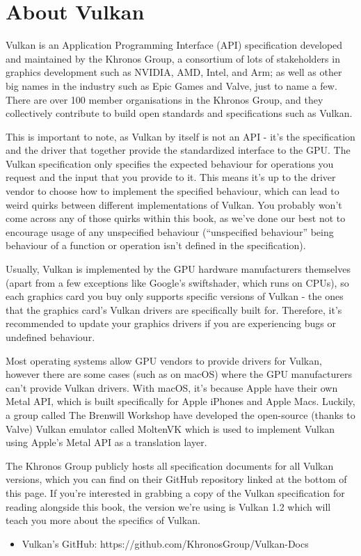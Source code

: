 \newpage
\section{\textsf{About Vulkan}}\label{about-vulkan}

Vulkan is an Application Programming Interface (API) specification
developed and maintained by the Khronos Group, a consortium of lots of stakeholders in graphics development such as NVIDIA, AMD, Intel, and Arm; as well as other big names in the industry such as Epic Games and Valve, just to name a few. There are over 100 member organisations in the Khronos Group, and they collectively contribute to build open standards and specifications such as Vulkan.

This is important to note, as Vulkan by itself is not an API - it's the specification and the driver that together provide the standardized interface to the GPU. The Vulkan specification only specifies the expected behaviour for operations you request and the input that you provide to it. This means it's up to the driver vendor to choose how to implement the specified behaviour, which can lead to weird quirks between different implementations of Vulkan. You probably won't come across any of those quirks within this book, as we've done our best not to encourage usage of any unspecified behaviour (``unspecified behaviour'' being behaviour of a function or operation isn't defined in the specification).

Usually, Vulkan is implemented by the GPU hardware manufacturers
themselves (apart from a few exceptions like Google's swiftshader, which runs on CPUs), so each graphics card you buy only supports specific versions of Vulkan - the ones that the graphics card's Vulkan drivers are specifically built for. Therefore, it's recommended to update your graphics drivers if you are experiencing bugs or undefined behaviour.

Most operating systems allow GPU vendors to provide drivers for Vulkan, however there are some cases (such as on macOS) where the GPU manufacturers can't provide Vulkan drivers. With macOS, it's because Apple have their own Metal API, which is built specifically for Apple iPhones and Apple Macs. Luckily, a group called The Brenwill Workshop have developed the open-source (thanks to Valve) Vulkan emulator called MoltenVK which is used to implement Vulkan using Apple's Metal API as a translation layer.

The Khronos Group publicly hosts all specification documents for all Vulkan versions, which you can find on their GitHub repository linked at the bottom of this page. If you're interested in grabbing a copy of the Vulkan specification for reading alongside this book, the version we're using is Vulkan 1.2 which will teach you more about the specifics of Vulkan.

\begin{itemize}
\itemsep1pt\parskip0pt
\item
  Vulkan's GitHub: https://github.com/KhronosGroup/Vulkan-Docs
\end{itemize}
